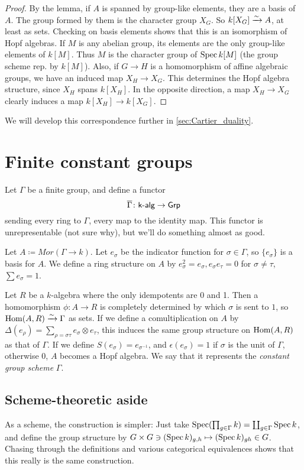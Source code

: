 \documentclass{memoir}
\begin{document}
\begin{proof}
	By the lemma, if $ A $ is spanned by group-like elements, they are a basis of $ A $. The group formed by them is the character group $ X_G $. So $ k[X_G]\xrightarrow{\sim} A $, at least as sets. Checking on basis elements shows that this is an isomorphism of Hopf algebras.
	If $ M $ is any abelian group, its elements are the only group-like elements of $ k[M] $. Thus $ M $ is the character group of $ \operatorname{Spec} k[M] $ (the group scheme rep. by $ k[M] $).
	Also, if $ G\to H $ is a homomorphism of affine algebraic groups, we have an induced map $ X_H\to X_G $. This determines the Hopf algebra structure, since $ X_H $ spans $ k[X_H] $. In the opposite direction, a map $ X_H\to X_G $ clearly induces a map $ k[X_H]\to k[X_G] $.
\end{proof}
We will develop this correspondence further in \cref{sec:Cartier_duality}.
\section{Finite constant groups}\label{sec:fin_const_gps}
Let $ \Gamma $ be a finite group, and define a functor \[ \overline{\Gamma}\colon \textsf{k-alg}\to {\normalfont\mathsf{Grp}} \] sending every ring to $ \Gamma $, every map to the identity map. This functor is unrepresentable (not sure why), but we'll do something almost as good.

Let $ A\coloneqq Mor(\Gamma\to k) $. Let $ e_\sigma $ be the indicator function for $ \sigma\in \Gamma $, so $ \{e_\sigma\} $ is a basis for $ A $. We define a ring structure on $ A $ by $ e_\sigma^2=e_\sigma, e_\sigma e_\tau =0 $ for $ \sigma\ne\tau $, $ \sum e_\sigma =1 $.

Let $ R $ be a $ k $-algebra where the only idempotents are 0 and 1. Then a homomorphism $ \phi\colon A\to R $ is completely determined by which $ \sigma $ is sent to $ 1 $, so $ \operatorname{Hom}(A,R)\xrightarrow{\sim} \Gamma $ as sets. If we define a comultiplication on $ A $ by $ \Delta(e_\rho)=\sum_{\rho=\sigma\tau}e_\sigma\otimes e_\tau$, this induces the same group structure on $ \operatorname{Hom}(A,R) $ as that of $ \Gamma $.
If we define $ S(e_\sigma)=e_{\sigma^{-1}} $, and $ \epsilon(e_\sigma)=1 $ if $ \sigma $ is the unit of $ \Gamma $, otherwise $ 0 $, $ A $ becomes a Hopf algebra. We say that it represents the \emph{constant group scheme} $ \Gamma $.
\subsection{Scheme-theoretic aside}
As a scheme, the construction is simpler: Just take $ \operatorname{Spec}(\prod_{g\in \Gamma} k)=\coprod_{g\in\Gamma}\operatorname{Spec} k $, and define the group structure by $G\times G\ni (\operatorname{Spec} k)_{g,h} \mapsto (\operatorname{Spec} k)_{gh} \in G$. Chasing through the definitions and various categorical equivalences shows that this really is the same construction.
\end{document}
